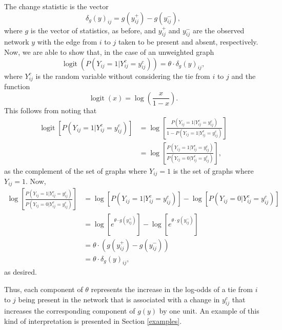 \documentclass[12pt,twoside]{reedthesis}
\theoremstyle{definition}
\theoremstyle{definition}
\theoremstyle{remark}
\begin{document}
\protect\hypertarget{def:change-stat}{}{\label{def:change-stat}}The change
statistic is the vector
\begin{equation}
\delta_{g}(y)_{ij} = g(y^{+}_{ij}) - g(y^{-}_{ij}),
\label{eq:changestat}
\end{equation}
where \(g\) is the vector of statistics, as before, and \(y^{+}_{ij}\)
and \(y^{-}_{ij}\) are the observed network \(y\) with the edge from
\(i\) to \(j\) taken to be present and absent, respectively.
 Now, we are able to show that, in the case of
an unweighted graph \[
\operatorname{logit} \left( P (Y_{ij} = 1 | Y^{c}_{ij} = y^{c}_{ij} ) \right) = \theta \cdot \delta_{g}(y)_{ij},
\] where \(Y^{c}_{ij}\) is the random variable without considering the
tie from \(i\) to \(j\) and the function \[
\operatorname{logit}(x) = \log \left(\frac{x}{1-x}\right).
\] This follows from noting that
\begin{align*}
\operatorname{logit} \left[ P(Y_{ij} = 1 | Y^{c}_{ij} = y^{c}_{ij}) \right] &= \operatorname{log} \left[ \frac{P(Y_{ij} = 1 | Y^{c}_{ij} = y^{c}_{ij})}{1 - P (Y_{ij} = 1 | Y^{c}_{ij} = y^{c}_{ij})} \right] \\
  &= \operatorname{log} \left[ \frac{P (Y_{ij} = 1 | Y^{c}_{ij} = y^{c}_{ij})}{P (Y_{ij} = 0 | Y^{c}_{ij} = y^{c}_{ij})} \right],
\end{align*}
as the complement of the set of graphs where \(Y_{ij} = 1\) is the set
of graphs where \(Y_{ij} = 1\). Now,
\begin{align*}
\operatorname{log} \left[ \frac{P (Y_{ij} = 1 | Y^{c}_{ij} = y^{c}_{ij})}{P (Y_{ij} = 0 | Y^{c}_{ij} = y^{c}_{ij})} \right]  &=\operatorname{log}[P (Y_{ij} = 1 | Y^{c}_{ij} = y^{c}_{ij})] - \operatorname{log}[P (Y_{ij} = 0 | Y^{c}_{ij} = y^{c}_{ij})] \\
  &= \operatorname{log}\left[e^{\theta \cdot g(y^{+}_{ij})}\right] - \operatorname{log}\left[e^{\theta \cdot g(y^{-}_{ij})}\right] \\
  &= \theta \cdot \left( g(y_{ij}^{+}) - g(y_{ij}^{-}) \right) \\
  &= \theta \cdot \delta_{g}(y)_{ij},
\end{align*}
as desired.

Thus, each component of \(\theta\) represents the increase in the
log-odds of a tie from \(i\) to \(j\) being present in the network that
is associated with a change in \(y^{c}_{ij}\) that increases the
corresponding component of \(g(y)\) by one unit. An example of this kind
of interpretation is presented in Section \ref{examples}.
\end{document}
